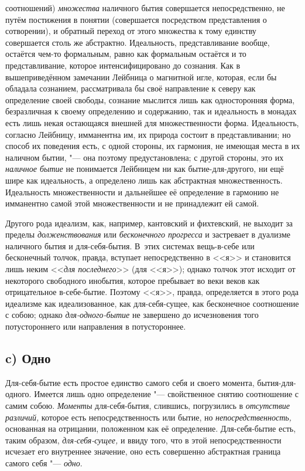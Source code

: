 соотношений) {\em множества} наличного бытия
совершается непосредственно, не путём постижения в понятии (совершается
посредством представления о сотворении), и обратный переход от этого
множества к тому единству совершается столь же абстрактно. Идеальность,
представливание вообще, остаётся чем-то формальным, равно как формальным
остаётся и то представливание, которое интенсифицировано до сознания. Как в
вышеприведённом замечании Лейбница о магнитной игле, которая, если
бы обладала сознанием, рассматривала бы своё направление к северу как
определение своей свободы, сознание мыслится лишь как односторонняя форма,
безразличная к своему определению и содержанию, так и идеальность в монадах
есть лишь некая остающаяся внешней для множественности форма. Идеальность,
согласно Лейбницу, имманентна им, их природа состоит в представливании; но
способ их поведения есть, с одной стороны, их гармония, не имеющая места в
их наличном бытии, "--- она поэтому предустановлена; с другой стороны, это их
{\em наличное бытие} не понимается Лейбницем ни как
бытие-для-другого, ни ещё шире как идеальность, а определено лишь как
абстрактная множественность. Идеальность множественности и дальнейшее её
определение в гармонию не имманентно самой этой множественности и не
принадлежит ей самой.

Другого рода идеализм, как, например, кантовский и фихтевский, не выходит за
пределы {\em долженствования} или
{\em бесконечного прогресса} и застревает в дуализме
наличного бытия и для-себя-бытия. В~этих системах вещь-в-себе или
бесконечный толчок, правда, вступает непосредственно в <<я>> и становится
лишь неким <<{\em для последнего}>> (для <<я>>); однако
толчок этот исходит от некоторого свободного инобытия, которое пребывает во
веки веков как отрицательное в-себе-бытие. Поэтому <<я>>, правда,
определяется в этого рода идеализме как идеализованное, как для-себя-сущее,
как бесконечное соотношение с собою; однако
{\em для-одного-бытие} не завершено до исчезновения
того потустороннего или направления в потустороннее.

\subsection[c) Одно]{c) Одно}

Для-себя-бытие есть простое единство самого себя и своего момента,
бытия-для-одного. Имеется лишь одно определение "--- свойственное снятию
соотношение с самим собою. {\em Моменты}
для-себя-бытия, слившись, погрузились в {\em отсутствие
различий,} которое есть непосредственность или бытие, но
{\em непосредственность,} основанная на отрицании,
положенном как её определение. Для-себя-бытие есть, таким образом,
{\em для-себя-сущее,} и ввиду того, что в этой
непосредственности исчезает его внутреннее значение, оно есть совершенно
абстрактная граница самого себя "--- {\em одно}.


